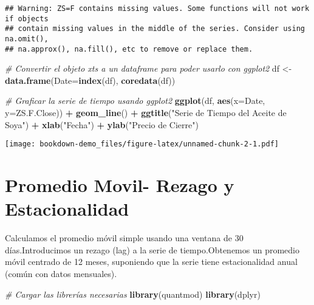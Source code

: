 \documentclass[
]{book}
\newenvironment{Shaded}{\begin{snugshade}}{\end{snugshade}}
\newcommand{\AttributeTok}[1]{\textcolor[rgb]{0.13,0.29,0.53}{#1}}
\newcommand{\CommentTok}[1]{\textcolor[rgb]{0.56,0.35,0.01}{\textit{#1}}}
\newcommand{\FunctionTok}[1]{\textcolor[rgb]{0.13,0.29,0.53}{\textbf{#1}}}
\newcommand{\NormalTok}[1]{#1}
\newcommand{\OtherTok}[1]{\textcolor[rgb]{0.56,0.35,0.01}{#1}}
\newcommand{\SpecialCharTok}[1]{\textcolor[rgb]{0.81,0.36,0.00}{\textbf{#1}}}
\newcommand{\StringTok}[1]{\textcolor[rgb]{0.31,0.60,0.02}{#1}}
\begin{document}
\begin{verbatim}
## Warning: ZS=F contains missing values. Some functions will not work if objects
## contain missing values in the middle of the series. Consider using na.omit(),
## na.approx(), na.fill(), etc to remove or replace them.
\end{verbatim}

\begin{Shaded}
\begin{Highlighting}[]
\CommentTok{\# Convertir el objeto xts a un dataframe para poder usarlo con ggplot2}
\NormalTok{df }\OtherTok{\textless{}{-}} \FunctionTok{data.frame}\NormalTok{(}\AttributeTok{Date=}\FunctionTok{index}\NormalTok{(df), }\FunctionTok{coredata}\NormalTok{(df))}

\CommentTok{\# Graficar la serie de tiempo usando ggplot2}
\FunctionTok{ggplot}\NormalTok{(df, }\FunctionTok{aes}\NormalTok{(}\AttributeTok{x=}\NormalTok{Date, }\AttributeTok{y=}\NormalTok{ZS.F.Close)) }\SpecialCharTok{+}
  \FunctionTok{geom\_line}\NormalTok{() }\SpecialCharTok{+}
  \FunctionTok{ggtitle}\NormalTok{(}\StringTok{"Serie de Tiempo del Aceite de Soya"}\NormalTok{) }\SpecialCharTok{+}
  \FunctionTok{xlab}\NormalTok{(}\StringTok{"Fecha"}\NormalTok{) }\SpecialCharTok{+} 
  \FunctionTok{ylab}\NormalTok{(}\StringTok{"Precio de Cierre"}\NormalTok{)}
\end{Highlighting}
\end{Shaded}

\texttt{[image: bookdown-demo\_files/figure-latex/unnamed-chunk-2-1.pdf]}

\hypertarget{promedio-movil--rezago-y-estacionalidad}{%
\chapter{Promedio Movil- Rezago y Estacionalidad}\label{promedio-movil--rezago-y-estacionalidad}}

Calculamos el promedio móvil simple usando una ventana de 30 días.Introducimos un rezago (lag) a la serie de tiempo.Obtenemos un promedio móvil centrado de 12 meses, suponiendo que la serie tiene estacionalidad anual (común con datos mensuales).

\begin{Shaded}
\begin{Highlighting}[]
\CommentTok{\# Cargar las librerías necesarias}
\FunctionTok{library}\NormalTok{(quantmod)}
\FunctionTok{library}\NormalTok{(dplyr)}
\end{Highlighting}
\end{Shaded}
\end{document}
